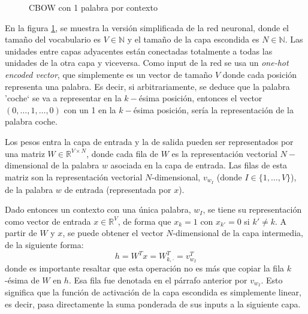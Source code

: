 \begin{figure}[H]
\begin{tikzpicture}[
          roundnode/.style={circle, draw=black, minimum size=4mm},
      ]
  \end{tikzpicture}
  \caption{CBOW con 1 palabra por contexto}
  \label{redneuronal:3}
\end{figure}

En la figura \ref{redneuronal:3}, se muestra la versión simplificada de la red neuronal, donde el tamaño del vocabulario es $V\in\mathbb{N}$ y el tamaño de la capa escondida es $N\in\mathbb{N}$.
Las unidades entre capas adyacentes están conectadas totalmente a todas las unidades de la otra capa y viceversa. Como input de la red se usa un \textit{one-hot encoded vector},
que simplemente es un vector de tamaño $V$ donde cada posición representa una palabra. Es decir, si arbitrariamente, se deduce que la palabra 'coche` se va a representar en la $k-$ésima
posición, entonces el vector $(0, \dots, 1, \dots, 0)$ con un 1 en la $k-$ésima posición, sería la representación de la palabra coche.

Los pesos entra la capa de entrada y la de salida pueden ser representados por una matriz $W\in\mathbb{R}^{V\times N}$, donde cada fila de $W$ es la representación
vectorial $N-$dimensional de la palabra $w$ asociada en la capa de entrada. Las filas de esta matriz son la representación vectorial $N$-dimensional, $v_{w_I}$ (donde $I\in\{1, \ldots, V\}$),
de la palabra $w$ de entrada (representada por $x$).

Dado entonces un contexto con una única palabra, $w_I$, se tiene su representación como vector de entrada $x\in\mathbb{R}^V$, de forma que $x_k=1$ con $x_{k'}=0$ si $k'\neq k$. A partir de
$W$ y $x$, se puede obtener el vector $N$-dimensional de la capa intermedia, de la siguiente forma:
\begin{equation}\label{eq:h}
  h=W^Tx=W^T_{k, \cdot}=v^T_{w_I}
\end{equation}
donde es importante resaltar que esta operación no es más que copiar la fila $k$-ésima de $W$ en $h$. Esa fila fue denotada en el párrafo anterior por $v_{w_I}$.
Esto significa que la función de activación de la capa escondida es simplemente linear, es decir, pasa directamente la suma ponderada de sus inputs a la siguiente capa.

